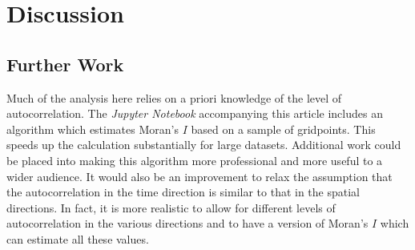 \documentclass[ijgi,article,submit,moreauthors,pdftex,10pt,a4paper]{Definitions/mdpi}
\begin{document}






\section{Discussion}


\subsection{Further Work}
\label{sec:Discussion/Further Work}

Much of the analysis here relies on a priori knowledge of the level of autocorrelation. The \textit{Jupyter Notebook} accompanying this article includes an algorithm which estimates Moran's $I$ based on a sample of gridpoints. This speeds up the calculation substantially for large datasets. Additional work could be placed into making this algorithm more professional and more useful to a wider audience. It would also be an improvement to relax the assumption that the autocorrelation in the time direction is similar to that in the spatial directions. In fact, it is more realistic to allow for different levels of autocorrelation in the various directions and to have a version of Moran's $I$ which can estimate all these values.
\end{document}
